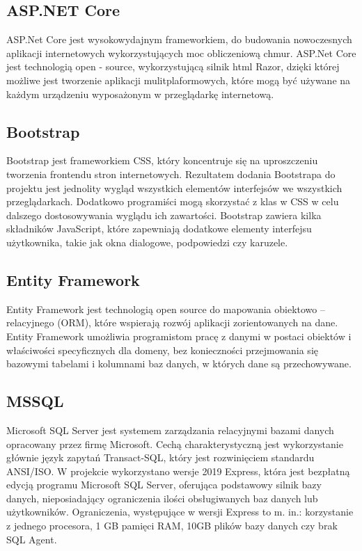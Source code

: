 \documentclass[12pt,a4paper]{article}
\begin{document}
		\subsection{ASP.NET Core}
			ASP.Net Core jest wysokowydajnym frameworkiem, do budowania nowoczesnych aplikacji internetowych wykorzystujących moc obliczeniową chmur. ASP.Net Core jest technologią open - source,
			wykorzystującą silnik html Razor, dzięki której możliwe jest tworzenie aplikacji mulitplaformowych, które mogą być używane na każdym urządzeniu wyposażonym w przeglądarkę
			internetową.
			
		\subsection{Bootstrap}		
			Bootstrap jest frameworkiem CSS, który koncentruje się na uproszczeniu tworzenia frontendu stron internetowych. Rezultatem dodania Bootstrapa do projektu jest jednolity wygląd
			wszystkich elementów interfejsów we wszystkich przeglądarkach. Dodatkowo programiści mogą skorzystać z klas w CSS w celu dalszego dostosowywania wyglądu ich zawartości. Bootstrap
			zawiera kilka składników JavaScript, które zapewniają dodatkowe elementy interfejsu użytkownika, takie jak okna dialogowe, podpowiedzi czy karuzele. 

		\subsection{Entity Framework}		 
		 Entity Framework jest technologią open source do mapowania obiektowo – relacyjnego (ORM), które wspierają rozwój aplikacji zorientowanych na dane.
		 Entity Framework umożliwia programistom pracę z danymi w postaci obiektów i właściwości specyficznych dla domeny, bez konieczności przejmowania się bazowymi
		 tabelami i kolumnami baz danych, w których dane są przechowywane. 

		\subsection{MSSQL}		 
		 	Microsoft SQL Server jest systemem zarządzania relacyjnymi bazami danych opracowany przez firmę Microsoft. Cechą charakterystyczną jest wykorzystanie głównie język zapytań
		 	Transact-SQL, który jest rozwinięciem standardu ANSI/ISO. W projekcie wykorzystano wersje 2019 Express, która jest bezpłatną edycją programu Microsoft SQL Server, oferująca
		 	podstawowy silnik bazy danych, nieposiadający ograniczenia ilości obsługiwanych baz danych lub użytkowników. Ograniczenia, występujące w wersji Express to  m. in.:
		 	korzystanie z jednego procesora, 1 GB pamięci RAM, 10GB plików bazy danych czy brak SQL Agent.
	
\end{document}
